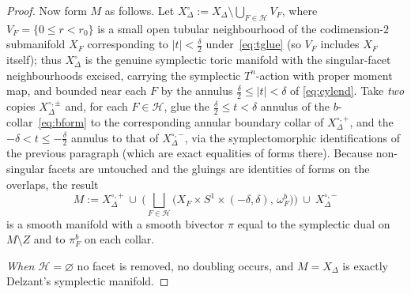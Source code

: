 \documentclass{amsart}
\theoremstyle{definition}
\begin{document}
\begin{proof}
Now form $M$ as follows. Let $X_\Delta^\circ:=X_\Delta\setminus\bigcup_{F\in
\mathcal H}V_F$, where $V_F=\{0\le r<r_0\}$ is a small open tubular neighbourhood
of the codimension-$2$ submanifold $X_F$ corresponding to
$|t|<\tfrac\delta2$ under~\eqref{eq:tglue} (so $V_F$ includes $X_F$ itself); thus
$X_\Delta^\circ$ is the genuine symplectic toric manifold with the singular-facet
neighbourhoods excised, carrying the symplectic $T^n$-action with proper moment
map, and bounded near each $F$ by the annulus $\tfrac\delta2\le|t|<\delta$ of
\eqref{eq:cylend}. Take \emph{two} copies $X_\Delta^{\circ,\pm}$ and, for each
$F\in\mathcal H$, glue the $\tfrac\delta2\le t<\delta$ annulus of the
$b$-collar~\eqref{eq:bform} to the corresponding annular boundary collar of
$X_\Delta^{\circ,+}$, and the $-\delta<t\le-\tfrac\delta2$ annulus to that of
$X_\Delta^{\circ,-}$, via the symplectomorphic identifications of the previous
paragraph (which are exact equalities of forms there). Because non-singular
facets are untouched and the gluings are identities of forms on the overlaps,
the result
\[
M:=X_\Delta^{\circ,+}\ \cup\ \Big(\textstyle\bigsqcup_{F\in\mathcal H}
\big(X_F\times S^1\times(-\delta,\delta),\,\omega^b_F\big)\Big)\ \cup\
X_\Delta^{\circ,-}
\]
is a smooth manifold with a smooth bivector $\pi$ equal to the symplectic dual
on $M\setminus Z$ and to $\pi^b_F$ on each collar.

\emph{When $\mathcal H=\varnothing$} no facet is removed, no doubling occurs, and
$M=X_\Delta$ is exactly Delzant's symplectic manifold.


\end{proof}
\end{document}
